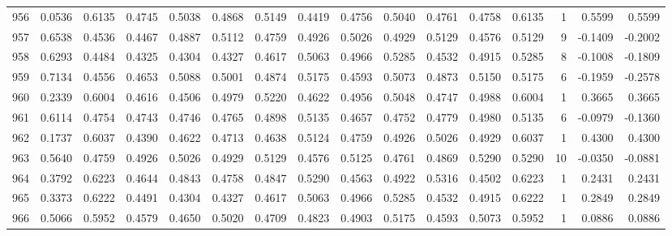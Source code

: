 \begin{tabular}{lrrrrrrrrrrrrrrr}
956 &      0.0536 &  0.6135 &  0.4745 &  0.5038 &  0.4868 &  0.5149 &  0.4419 &  0.4756 &  0.5040 &  0.4761 &   0.4758 &     0.6135 &      1 &                    0.5599 &                     0.5599 \\
957 &      0.6538 &  0.4536 &  0.4467 &  0.4887 &  0.5112 &  0.4759 &  0.4926 &  0.5026 &  0.4929 &  0.5129 &   0.4576 &     0.5129 &      9 &                   -0.1409 &                    -0.2002 \\
958 &      0.6293 &  0.4484 &  0.4325 &  0.4304 &  0.4327 &  0.4617 &  0.5063 &  0.4966 &  0.5285 &  0.4532 &   0.4915 &     0.5285 &      8 &                   -0.1008 &                    -0.1809 \\
959 &      0.7134 &  0.4556 &  0.4653 &  0.5088 &  0.5001 &  0.4874 &  0.5175 &  0.4593 &  0.5073 &  0.4873 &   0.5150 &     0.5175 &      6 &                   -0.1959 &                    -0.2578 \\
960 &      0.2339 &  0.6004 &  0.4616 &  0.4506 &  0.4979 &  0.5220 &  0.4622 &  0.4956 &  0.5048 &  0.4747 &   0.4988 &     0.6004 &      1 &                    0.3665 &                     0.3665 \\
961 &      0.6114 &  0.4754 &  0.4743 &  0.4746 &  0.4765 &  0.4898 &  0.5135 &  0.4657 &  0.4752 &  0.4779 &   0.4980 &     0.5135 &      6 &                   -0.0979 &                    -0.1360 \\
962 &      0.1737 &  0.6037 &  0.4390 &  0.4622 &  0.4713 &  0.4638 &  0.5124 &  0.4759 &  0.4926 &  0.5026 &   0.4929 &     0.6037 &      1 &                    0.4300 &                     0.4300 \\
963 &      0.5640 &  0.4759 &  0.4926 &  0.5026 &  0.4929 &  0.5129 &  0.4576 &  0.5125 &  0.4761 &  0.4869 &   0.5290 &     0.5290 &     10 &                   -0.0350 &                    -0.0881 \\
964 &      0.3792 &  0.6223 &  0.4644 &  0.4843 &  0.4758 &  0.4847 &  0.5290 &  0.4563 &  0.4922 &  0.5316 &   0.4502 &     0.6223 &      1 &                    0.2431 &                     0.2431 \\
965 &      0.3373 &  0.6222 &  0.4491 &  0.4304 &  0.4327 &  0.4617 &  0.5063 &  0.4966 &  0.5285 &  0.4532 &   0.4915 &     0.6222 &      1 &                    0.2849 &                     0.2849 \\
966 &      0.5066 &  0.5952 &  0.4579 &  0.4650 &  0.5020 &  0.4709 &  0.4823 &  0.4903 &  0.5175 &  0.4593 &   0.5073 &     0.5952 &      1 &                    0.0886 &                     0.0886 \\

\end{tabular}
